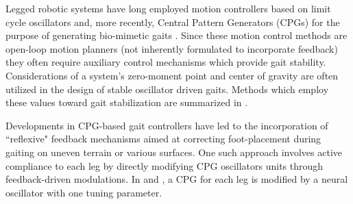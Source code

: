 
Legged robotic systems have long employed motion controllers based on limit cycle oscillators and, more recently, Central Pattern Generators (CPGs)  for the purpose of generating bio-mimetic gaits \cite{Matsuoka1985,Collins1993,Endo2004,Righetti2006,Ijspeert2008,Matos2010,Ajallooeian2013,Park2014,Fukuoka2015}. Since these motion control methods are open-loop motion planners (\IE not inherently formulated to incorporate feedback) they often require auxiliary control mechanisms which provide gait stability. Considerations of a system's zero-moment point and center of gravity are often utilized in the design of stable oscillator driven gaits. Methods which employ these values toward gait stabilization are summarized in \cite{Wieber2015}. %

Developments in CPG-based gait controllers have led to the incorporation of ``reflexive" feedback mechanisms aimed at correcting foot-placement during gaiting on uneven terrain or various surfaces. One such approach involves active compliance to each leg by directly modifying CPG oscillators units through feedback-driven modulations. In \cite{Endo2004} and \cite{Fukuoka2003}, a CPG for each leg is modified by a neural oscillator with one tuning parameter.  

